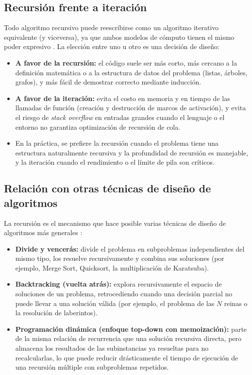 \documentclass{article}
\begin{document}
\subsection{Recursión frente a iteración}
 
Todo algoritmo recursivo puede reescribirse como un algoritmo iterativo
equivalente (y viceversa), ya que ambos modelos de cómputo tienen el mismo
poder expresivo \citep{brassardbratley1996}. La elección entre uno u otro
es una decisión de diseño:
 
\begin{itemize}
  \item \textbf{A favor de la recursión:} el código suele ser más corto, más
        cercano a la definición matemática o a la estructura de datos del
        problema (listas, árboles, grafos), y más fácil de demostrar
        correcto mediante inducción.
  \item \textbf{A favor de la iteración:} evita el costo en memoria y en
        tiempo de las llamadas de función (creación y destrucción de marcos
        de activación), y evita el riesgo de \emph{stack overflow} en
        entradas grandes cuando el lenguaje o el entorno no garantiza
        optimización de recursión de cola.
  \item En la práctica, se prefiere la recursión cuando el problema tiene una
        estructura naturalmente recursiva y la profundidad de recursión es
        manejable, y la iteración cuando el rendimiento o el límite de pila
        son críticos.
\end{itemize}
 
\subsection{Relación con otras técnicas de diseño de algoritmos}
 
La recursión es el mecanismo que hace posible varias técnicas de diseño de
algoritmos más generales \citep{clrs}:
 
\begin{itemize}
  \item \textbf{Divide y vencerás:} divide el problema en subproblemas
        independientes del mismo tipo, los resuelve recursivamente y combina
        sus soluciones (por ejemplo, Merge Sort, Quicksort, la multiplicación
        de Karatsuba).
  \item \textbf{Backtracking (vuelta atrás):} explora recursivamente el
        espacio de soluciones de un problema, retrocediendo cuando una
        decisión parcial no puede llevar a una solución válida (por ejemplo,
        el problema de las $N$ reinas o la resolución de laberintos).
  \item \textbf{Programación dinámica (enfoque top-down con memoización):}
        parte de la misma relación de recurrencia que una solución recursiva
        directa, pero almacena los resultados de las subinstancias ya
        resueltas para no recalcularlas, lo que puede reducir drásticamente
        el tiempo de ejecución de una recursión múltiple con subproblemas
        repetidos.
\end{itemize}
 
\end{document}
